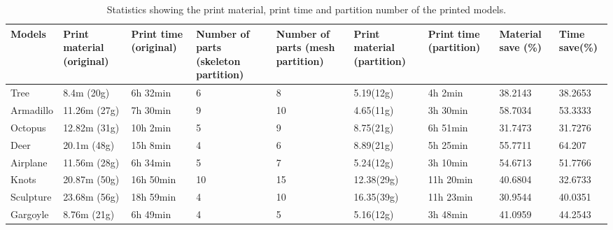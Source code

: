 \begin{table}[htb]

\begin{footnotesize}

\begin{center}

    \begin{tabular}{p{1cm} p{2cm} p{2cm} p{1.6cm} p{1.6cm} p{1.5cm} p{1.5cm} p{1.5cm} p{1.5cm}}

    \hline

     Models& Print material (original)& Print time (original)& Number of parts (skeleton partition)& Number of parts (mesh partition)& Print material (partition)& Print time (partition)& Material save (\%) &Time save(\%)\\ \hline
     Tree& 8.4m (20g)& 6h 32min &6 & 8 &5.19(12g) & 4h 2min & 38.2143 &38.2653\\ \hline
     Armadillo& 11.26m (27g)& 7h 30min &9 & 10  &4.65(11g) & 3h 30min & 58.7034 &53.3333\\ \hline
     Octopus& 12.82m (31g)& 10h 2min &5 & 9  &8.75(21g) &6h 51min & 31.7473 &31.7276\\ \hline
     Deer& 20.1m (48g)& 15h 8min &4 & 6  &8.89(21g) &5h 25min & 55.7711 &64.207\\ \hline
     Airplane& 11.56m (28g)& 6h 34min &5 & 7 &5.24(12g) &3h 10min & 54.6713 &51.7766\\ \hline
     Knots& 20.87m (50g)& 16h 50min &10 & 15 &12.38(29g) &11h 20min & 40.6804 &32.6733\\ \hline
     Sculpture& 23.68m (56g)& 18h 59min &4 & 10 &16.35(39g) &11h 23min & 30.9544 &40.0351\\ \hline
     Gargoyle& 8.76m (21g)& 6h 49min &4 & 5 &5.16(12g) &3h 48min & 41.0959 &44.2543\\ \hline

  \hline

    \end{tabular}

\end{center}

\end{footnotesize}

\caption{Statistics showing the print material, print time and partition number of the printed models.}\label{tab:ertms:summary}

\end{table}


